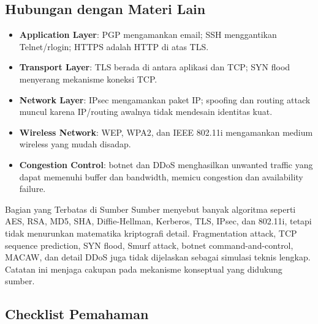 \subsection{Hubungan dengan Materi Lain}

\begin{itemize}
    \item \textbf{Application Layer}: PGP mengamankan email; SSH menggantikan Telnet/rlogin; HTTPS adalah HTTP di atas TLS.
    \item \textbf{Transport Layer}: TLS berada di antara aplikasi dan TCP; SYN flood menyerang mekanisme koneksi TCP.
    \item \textbf{Network Layer}: IPsec mengamankan paket IP; spoofing dan routing attack muncul karena IP/routing awalnya tidak mendesain identitas kuat.
    \item \textbf{Wireless Network}: WEP, WPA2, dan IEEE 802.11i mengamankan medium wireless yang mudah disadap.
    \item \textbf{Congestion Control}: botnet dan DDoS menghasilkan unwanted traffic yang dapat memenuhi buffer dan bandwidth, memicu congestion dan availability failure.
\end{itemize}

\begin{cmt}{Bagian yang Terbatas di Sumber}{}
Sumber menyebut banyak algoritma seperti AES, RSA, MD5, SHA, Diffie-Hellman, Kerberos, TLS, IPsec, dan 802.11i, tetapi tidak menurunkan matematika kriptografi detail. Fragmentation attack, TCP sequence prediction, SYN flood, Smurf attack, botnet command-and-control, MACAW, dan detail DDoS juga tidak dijelaskan sebagai simulasi teknis lengkap. Catatan ini menjaga cakupan pada mekanisme konseptual yang didukung sumber.
\end{cmt}

\subsection{Checklist Pemahaman}

